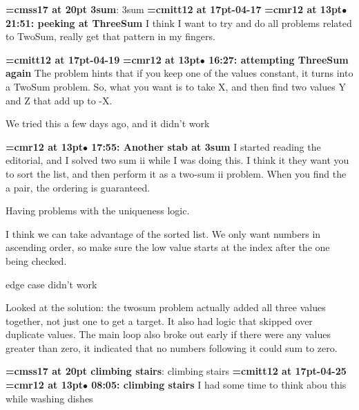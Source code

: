{\medskip\noindent\bf\font\titlefont=cmss17 at 20pt 3sum}: 3sum
{\medskip\noindent\bf\font\titlefont=cmitt12 at 17pt-04-17}\medskip
{\smallskip\noindent\bf\font\titlefont=cmr12 at 13pt\titlefont $\bullet$ 21:51: peeking at ThreeSum}\smallskip
I think I want to try and do all problems related to TwoSum, really get that pattern in my fingers.
\par

{\medskip\noindent\bf\font\titlefont=cmitt12 at 17pt-04-19}\medskip
{\smallskip\noindent\bf\font\titlefont=cmr12 at 13pt\titlefont $\bullet$ 16:27: attempting ThreeSum again}\smallskip
The problem hints that if you keep one of the values constant, it turns into a TwoSum problem. So, what you want is to take X, and then find two values Y and Z that add up to -X.
\par

We tried this a few days ago, and it didn't work
\par

{\smallskip\noindent\bf\font\titlefont=cmr12 at 13pt\titlefont $\bullet$ 17:55: Another stab at 3sum}\smallskip
I started reading the editorial, and I solved two sum ii while I was doing this. I think it they want you to sort the list, and then perform it as a two-sum ii problem. When you find the a pair, the ordering is guaranteed.
\par

Having problems with the uniqueness logic.
\par

I think we can take advantage of the sorted list. We only want numbers in ascending order, so make sure the low value starts at the index after the one being checked.
\par

edge case didn't work
\par

Looked at the solution: the twosum problem actually added all three values together, not just one to get a target. It also had logic that skipped over duplicate values. The main loop also broke out early if there were any values greater than zero, it indicated that no numbers following it could sum to zero.
\par

{\medskip\noindent\bf\font\titlefont=cmss17 at 20pt climbing stairs}: climbing stairs
{\medskip\noindent\bf\font\titlefont=cmitt12 at 17pt-04-25}\medskip
{\smallskip\noindent\bf\font\titlefont=cmr12 at 13pt\titlefont $\bullet$ 08:05: climbing stairs}\smallskip
I had some time to think abou this while washing dishes
\par

